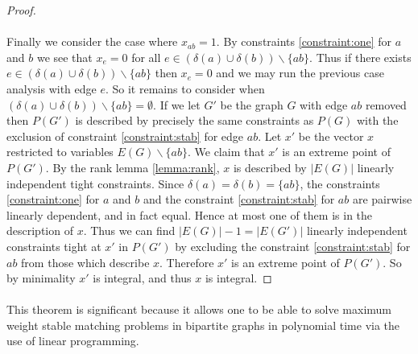 \begin{proof}
\paragraph{}
Finally we consider the case where $x_{ab} = 1$. By constraints \ref{constraint:one} for $a$ and $b$ we see that $x_{e} = 0$ for all $e \in (\delta(a) \cup \delta(b))\backslash \{ab\}$. Thus if there exists $e \in (\delta(a) \cup \delta(b))\backslash \{ab\}$ then $x_e = 0$ and we may run the previous case analysis with edge $e$. So it remains to consider when $(\delta(a) \cup \delta(b))\backslash \{ab\} = \emptyset$. If we let $G'$ be the graph $G$ with edge $ab$ removed then $P(G')$ is described by precisely the same constraints as $P(G)$ with the exclusion of constraint \ref{constraint:stab} for edge $ab$. Let $x'$ be the vector $x$ restricted to variables $E(G)\backslash\{ab\}$. We claim that $x'$ is an extreme point of $P(G')$. By the rank lemma \ref{lemma:rank}, $x$ is described by $|E(G)|$ linearly independent tight constraints. Since $\delta(a) = \delta(b) = \{ab\}$, the constraints \ref{constraint:one} for $a$ and $b$ and the constraint \ref{constraint:stab} for $ab$ are pairwise linearly dependent, and in fact equal. Hence at most one of them is in the description of $x$. Thus we can find $|E(G)| -1 = |E(G')|$ linearly independent constraints tight at $x'$ in $P(G')$ by excluding the constraint \ref{constraint:stab} for $ab$ from those which describe $x$. Therefore $x'$ is an extreme point of $P(G')$. So by minimality $x'$ is integral, and thus $x$ is integral.
\end{proof}
\paragraph{}
This theorem is significant because it allows one to be able to solve maximum weight stable matching problems in bipartite graphs in polynomial time via the use of linear programming.